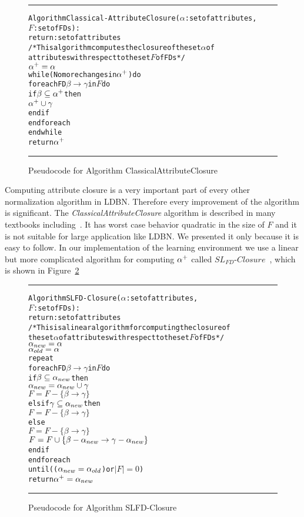 \begin{figure}[htbp]
\hrule
\vspace{0.25cm}
\begin{alltt}
Algorithm Classical-AttributeClosure(\(\alpha\): set of attributes, 
              \(F\): set of FDs):
           return: set of attributes
/* This algorithm computes the closure of the set \(\alpha\) of
    attributes with respect to the set  \(F\) of FDs */
  \(\alpha\sp{+} = \alpha\)
  while(No more changes in \(\alpha\sp{+}\)) do
    foreach FD \(\beta \rightarrow \gamma\) in \(F\) do
      if \(\beta \subseteq \alpha\sp{+}\) then 
        \(\alpha\sp{+} \cup \gamma\)
      end if
    end foreach
  end while
  return \(\alpha\sp{+}\)
\end{alltt} 
\caption{Pseudocode for Algorithm ClassicalAttributeClosure}\label{fig:attclosure}
\hrule
\end{figure}

Computing attribute closure is a very important part of every other normalization algorithm 
in LDBN. Therefore every improvement 
of the algorithm is significant. 
The \textit{ClassicalAttributeClosure} algorithm is described in many textbooks including~\cite{bdb1, bdb2, bdb4}.
It has worst case behavior quadratic in the size of $F$ and
it is not suitable for large application like LDBN. We presented it only because it is
easy to follow. In our implementation of the learning environment we use a linear but more complicated 
algorithm for computing $\alpha\sp{+}$ 
called $SL_{FD}$-$Closure$~\cite{p10}, which is shown in Figure~\ref{alg:slfdclosure}

\begin{figure}[htbp]
\hrule
\vspace{0.25cm}
\begin{alltt}
Algorithm SLFD-Closure(\(\alpha\): set of attributes, 
              \(F\): set of FDs):
           return: set of attributes
/* This is a linear algorithm for computing the closure of 
  the set \(\alpha\) of attributes with respect to the set \(F\) of FDs */
  \(\alpha\sb{new} = \alpha\)
  \(\alpha\sb{old} = \alpha\)
  repeat
    foreach FD \(\beta \rightarrow \gamma\) in \(F\) do
      if \(\beta \subseteq \alpha\sb{new}\) then 
        \(\alpha\sb{new} = \alpha\sb{new} \cup \gamma\)
        \(F = F - \{\beta \rightarrow \gamma\}\) 
      elsif \(\gamma \subseteq \alpha\sb{new}\) then
        \(F = F - \{\beta \rightarrow \gamma\}\) 
      else
        \(F = F - \{\beta \rightarrow \gamma\}\) 
        \(F = F \cup \{\beta-\alpha\sb{new} \rightarrow \gamma-\alpha\sb{new}\}\) 
      end if
    end foreach 
  until ((\(\alpha\sb{new} = \alpha\sb{old}\)) or \(|F| = 0\))
  return \(\alpha\sp{+} = \alpha\sb{new}\)
\end{alltt} 
\caption{Pseudocode for Algorithm SLFD-Closure}\label{alg:slfdclosure}
\hrule
\end{figure}

